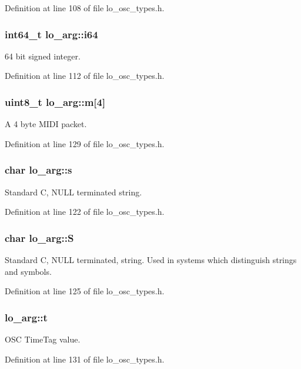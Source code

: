 Definition at line 108 of file lo\+\_\+osc\+\_\+types.\+h.

\hypertarget{unionlo__arg_afe8046a8395e9af51cc759034ccfedd5}{
\subsubsection[{i64}]{\setlength{\rightskip}{0pt plus 5cm}int64\+\_\+t lo\+\_\+arg\+::i64}}\label{unionlo__arg_afe8046a8395e9af51cc759034ccfedd5}
64 bit signed integer. 

Definition at line 112 of file lo\+\_\+osc\+\_\+types.\+h.

\hypertarget{unionlo__arg_a96d32df951c54eaff5dc67fc97a70c83}{
\subsubsection[{m}]{\setlength{\rightskip}{0pt plus 5cm}uint8\+\_\+t lo\+\_\+arg\+::m\mbox{[}4\mbox{]}}}\label{unionlo__arg_a96d32df951c54eaff5dc67fc97a70c83}
A 4 byte M\+I\+D\+I packet. 

Definition at line 129 of file lo\+\_\+osc\+\_\+types.\+h.

\hypertarget{unionlo__arg_a15bbcf8284d75ad441b5cde7218548f6}{
\subsubsection[{s}]{\setlength{\rightskip}{0pt plus 5cm}char lo\+\_\+arg\+::s}}\label{unionlo__arg_a15bbcf8284d75ad441b5cde7218548f6}
Standard C, N\+U\+L\+L terminated string. 

Definition at line 122 of file lo\+\_\+osc\+\_\+types.\+h.

\hypertarget{unionlo__arg_ab9c6a9c09ea094d58f889ed1a5edba0b}{
\subsubsection[{S}]{\setlength{\rightskip}{0pt plus 5cm}char lo\+\_\+arg\+::\+S}}\label{unionlo__arg_ab9c6a9c09ea094d58f889ed1a5edba0b}
Standard C, N\+U\+L\+L terminated, string. Used in systems which distinguish strings and symbols. 

Definition at line 125 of file lo\+\_\+osc\+\_\+types.\+h.

\hypertarget{unionlo__arg_afc89e5569fba7a660638839366b17408}{
\subsubsection[{t}]{ lo\+\_\+arg\+::t}}\label{unionlo__arg_afc89e5569fba7a660638839366b17408}
O\+S\+C Time\+Tag value. 

Definition at line 131 of file lo\+\_\+osc\+\_\+types.\+h.

